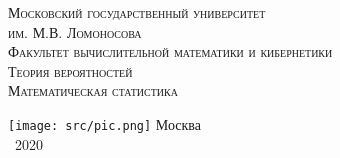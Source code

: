 \begin{titlepage}
    \centering
    \vfill
    {\scshape\large
        Московский государственный университет\\
        им. М.В. Ломоносова\\
        Факультет вычислительной математики и кибернетики\\
   }
    \vskip1cm
    {\scshape\huge
        Теория вероятностей\\
        Математическая статистика\\
   }

    \vfill
    \texttt{[image: src/pic.png]}
    \vfill
    {\upshape\large
        Москва\\
        ~2020
   }
\end{titlepage}
